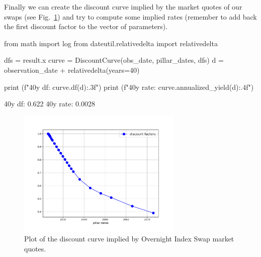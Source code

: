 %

Finally we can create the discount curve implied by the market quotes of our swaps (see Fig.~\ref{fig:discount_curve}) and try to compute some implied rates (remember to add back the first discount factor to the vector of parameters).

\begin{ipython}
from math import log
from dateutil.relativedelta import relativedelta

dfs = result.x
curve = DiscountCurve(obs_date, pillar_dates, dfs)
d = observation_date + relativedelta(years=40)

print (f"40y df: {curve.df(d):.3f}")
print (f"40y rate: {curve.annualized_yield(d):.4f}")
\end{ipython}
\begin{ioutput}
40y df: 0.622
40y rate: 0.0028
\end{ioutput}

\begin{figure}[htb]
	\centering
	\includegraphics[width=0.7\textwidth]{figures/example_discount_curve}
	\caption{Plot of the discount curve implied by Overnight Index Swap market quotes.}
	\label{fig:discount_curve}
\end{figure}

